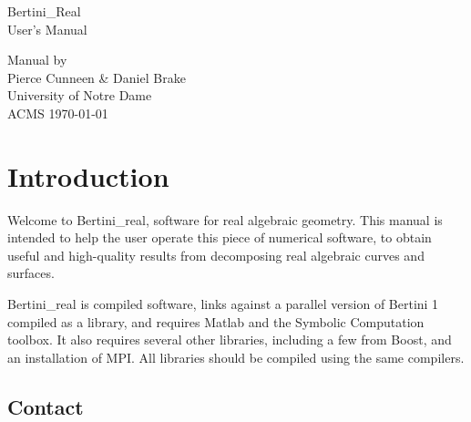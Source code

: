 \documentclass[10pt]{article}
\begin{document}
\pagestyle{plain} 
	\setcounter{page}{1}




\thispagestyle{empty}


\begin{center}


\quad %
\vspace{3in}


{\LARGE Bertini\_Real}\\[\baselineskip]
User's Manual
\vskip0.5in


\vfill%

\end{center}
\null
\vfill
\begin{singlespace}
Manual by\\
Pierce Cunneen \& Daniel Brake\\
University of Notre Dame \\
ACMS \hfill \today
\end{singlespace}
\newpage





	\tableofcontents
	\eject
	\setcounter{page}{1}
	\eject



\section{Introduction}


Welcome to Bertini\_real, software for real algebraic geometry.  This manual is intended to help the user operate this piece of numerical software, to obtain useful and high-quality results from decomposing real algebraic curves and surfaces.

Bertini\_real is compiled software, links against a parallel version of Bertini 1 compiled as a library, and requires Matlab and the Symbolic Computation toolbox.  It also requires several other libraries, including a few from Boost, and an installation of MPI.  All libraries should be compiled using the same compilers.  

\subsection{Contact}
\label{sec:contact}
\end{document}
